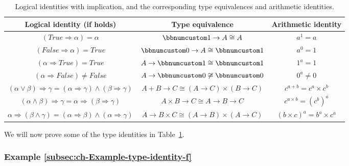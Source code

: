 \begin{table}
\begin{centering}
\begin{tabular}{|c|c|c|}
\hline 
\textbf{\small{}Logical identity (if holds)} & \textbf{\small{}Type equivalence} & \textbf{\small{}Arithmetic identity}\tabularnewline
\hline 
\hline 
{\small{}$\left(True\Rightarrow\alpha\right)=\alpha$} & {\small{}$\bbnum 1\rightarrow A\cong A$} & {\small{}$a^{1}=a$}\tabularnewline
\hline 
{\small{}$\left(False\Rightarrow\alpha\right)=True$} & {\small{}$\bbnum 0\rightarrow A\cong\bbnum 1$} & {\small{}$a^{0}=1$}\tabularnewline
\hline 
{\small{}$\left(\alpha\Rightarrow True\right)=True$} & {\small{}$A\rightarrow\bbnum 1\cong\bbnum 1$} & {\small{}$1^{a}=1$}\tabularnewline
\hline 
{\small{}$\left(\alpha\Rightarrow False\right)\neq False$} & {\small{}$A\rightarrow\bbnum 0\not\cong\bbnum 0$} & {\small{}$0^{a}\neq0$}\tabularnewline
\hline 
{\small{}$\left(\alpha\vee\beta\right)\Rightarrow\gamma=\left(\alpha\Rightarrow\gamma\right)\wedge\left(\beta\Rightarrow\gamma\right)$} & {\small{}$A+B\rightarrow C\cong\left(A\rightarrow C\right)\times\left(B\rightarrow C\right)$} & {\small{}$c^{a+b}=c^{a}\times c^{b}$}\tabularnewline
\hline 
{\small{}$(\alpha\wedge\beta)\Rightarrow\gamma=\alpha\Rightarrow\left(\beta\Rightarrow\gamma\right)$} & {\small{}$A\times B\rightarrow C\cong A\rightarrow B\rightarrow C$} & {\small{}$c^{a\times b}=\left(c^{b}\right)^{a}$}\tabularnewline
\hline 
{\small{}$\alpha\Rightarrow\left(\beta\wedge\gamma\right)=\left(\alpha\Rightarrow\beta\right)\wedge\left(\alpha\Rightarrow\gamma\right)$} & {\small{}$A\rightarrow B\times C\cong\left(A\rightarrow B\right)\times\left(A\rightarrow C\right)$} & {\small{}$\left(b\times c\right)^{a}=b^{a}\times c^{a}$}\tabularnewline
\hline 
\end{tabular}
\par\end{centering}
\caption{Logical identities with implication, and the corresponding type equivalences
and arithmetic identities.\label{tab:Logical-identities-with-function-types}}
\end{table}

We will now prove some of the type identities in Table~\ref{tab:Logical-identities-with-function-types}.

\subsubsection{Example \label{subsec:ch-Example-type-identity-f}\ref{subsec:ch-Example-type-identity-f}}

